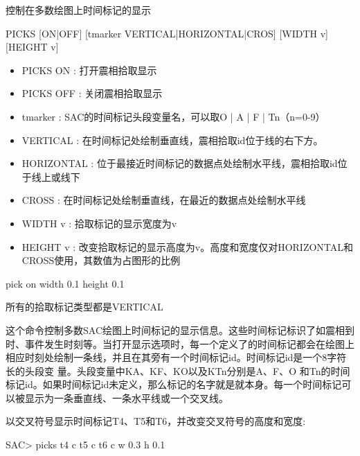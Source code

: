 \label{cmd:picks}

控制在多数绘图上时间标记的显示

\begin{SACSTX}
PICKS [ON|OFF] [tmarker VERTICAL|HORIZONTAL|CROS] [WIDTH v] [HEIGHT v]
\end{SACSTX}

\begin{itemize}
\item PICKS ON : 打开震相拾取显示 
\item PICKS OFF : 关闭震相拾取显示 
\item tmarker : SAC的时间标记头段变量名，可以取O | A | F | Tn（n=0-9）
\item VERTICAL : 在时间标记处绘制垂直线，震相拾取id位于线的右下方。
\item HORIZONTAL : 位于最接近时间标记的数据点处绘制水平线，震相拾取id位于线上或线下
\item CROSS : 在时间标记处绘制垂直线，在最近的数据点处绘制水平线 
\item WIDTH v : 拾取标记的显示宽度为v 
\item HEIGHT v : 改变拾取标记的显示高度为v。高度和宽度仅对HORIZONTAL和CROSS使用，其数值为占图形的比例 
\end{itemize}

\begin{SACDFT}
pick on width 0.1 height 0.1
\end{SACDFT}
所有的拾取标记类型都是VERTICAL

这个命令控制多数SAC绘图上时间标记的显示信息。这些时间标记标识了如震相到时、事件发生时刻等。当打开显示选项时，每一个定义了的时间标记都会在绘图上相应时刻处绘制一条线，并且在其旁有一个时间标记id。时间标记id是一个8字符长的头段变	量。头段变量中KA、KF、KO以及KTn分别是A、F、O 和Tn的时间标记id。如果时间标记id未定义，那么标记的名字就是就本身。每一个时间标记可以被显示为一条垂直线、一条水平线或一个交叉线。

以交叉符号显示时间标记T4、T5和T6，并改变交叉符号的高度和宽度:
\begin{SACCode}
SAC> picks t4 c t5 c t6 c w 0.3 h 0.1
\end{SACCode}
